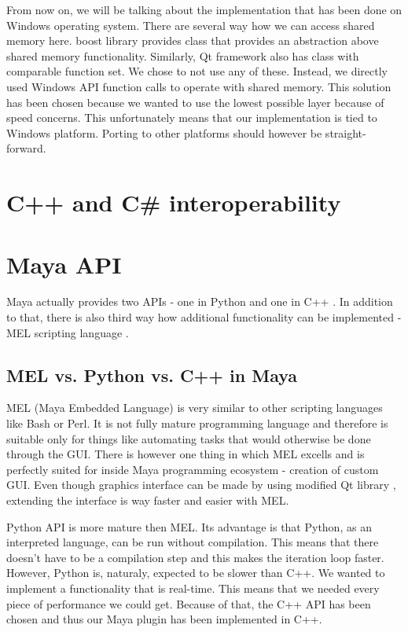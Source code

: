 \documentclass[
  digital, %
  table,   %
  nolof,     %
  nolot,     %
]{fithesis3}
\begin{document}
From now on, we will be talking about the implementation that has been done on Windows operating system. There are several way how we can access shared memory here. boost library provides class that provides an abstraction above shared memory functionality. Similarly, Qt framework also has class with comparable function set. We chose to not use any of these. Instead, we directly used Windows API function calls to operate with shared memory. This solution has been chosen because we wanted to use the lowest possible layer because of speed concerns. This unfortunately means that our implementation is tied to Windows platform. Porting to other platforms should however be straight-forward.

\section{C++ and C\# interoperability}

\section{Maya API}
Maya actually provides two APIs - one in Python \cite{MayaAPIPython} and one in C++ \cite{MayaAPICpp}. In addition to that, there is also third way how additional functionality can be implemented - MEL scripting language \cite{MayaMEL}.


\subsection{MEL vs. Python vs. C++ in Maya}
MEL (Maya Embedded Language) is very similar to other scripting languages like Bash or Perl. It is not fully mature programming language and therefore is suitable only for things like automating tasks that would otherwise be done through the GUI. There is however one thing in which MEL excells and is perfectly suited for inside Maya programming ecosystem - creation of custom GUI. Even though graphics interface can be made by using modified Qt library \cite{MayaQt}, extending the interface is way faster and easier with MEL.

Python API is more mature then MEL. Its advantage is that Python, as an interpreted language, can be run without compilation. This means that there doesn't have to be a compilation step and this makes the iteration loop faster. However, Python is, naturaly, expected to be slower than C++. We wanted to implement a functionality that is real-time. This means that we needed every piece of performance we could get. Because of that, the C++ API has been chosen and thus our Maya plugin has been implemented in C++.
\end{document}
